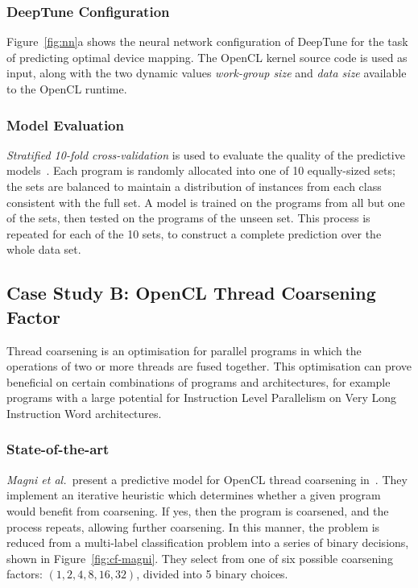 


\subsubsection{DeepTune Configuration} 

Figure~\ref{fig:nn}a shows the neural network configuration of DeepTune for the task of predicting optimal device mapping. The OpenCL kernel source code is used as input, along with the two dynamic values \emph{work-group size} and \emph{data size} available to the OpenCL runtime.

\subsubsection{Model Evaluation} 

\emph{Stratified 10-fold cross-validation} is used to evaluate the quality of the predictive models~\cite{Han2011}. Each program is randomly allocated into one of 10 equally-sized sets; the sets are balanced to maintain a distribution of instances from each class consistent with the full set. A model is trained on the programs from all but one of the sets, then tested on the programs of the unseen set. This process is repeated for each of the 10 sets, to construct a complete prediction over the whole data set.




\subsection{Case Study B: OpenCL Thread Coarsening Factor}

Thread coarsening is an optimisation for parallel programs in which the operations of two or more threads are fused together. This optimisation can prove beneficial on certain combinations of programs and architectures, for example programs with a large potential for Instruction Level Parallelism on Very Long Instruction Word architectures.

\subsubsection{State-of-the-art} \emph{Magni et al.\ }present a predictive model for OpenCL thread coarsening in~\cite{Magni2014}. They implement an iterative heuristic which determines whether a given program would benefit from coarsening. If yes, then the program is coarsened, and the process repeats, allowing further coarsening. In this manner, the problem is reduced from a multi-label classification problem into a series of binary decisions, shown in Figure~\ref{fig:cf-magni}. They select from one of six possible coarsening factors: $(1, 2, 4, 8, 16, 32)$, divided into 5 binary choices.

